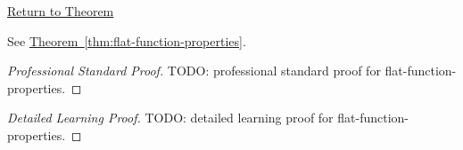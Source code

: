 \newpage
{}
\label{prf:flat-function-properties}

\begin{remark*}[Return]
\hyperref[thm:flat-function-properties]{Return to Theorem}
\end{remark*}

\begin{theorem*}
See \hyperref[thm:flat-function-properties]{Theorem~\ref*{thm:flat-function-properties}}.
\end{theorem*}

\begin{proof}[Professional Standard Proof]
\LRAProofBodyStart
TODO: professional standard proof for flat-function-properties.
\end{proof}

\begin{proof}[Detailed Learning Proof]
\LRAProofBodyStart
TODO: detailed learning proof for flat-function-properties.
\end{proof}

\begin{remark*}
\end{remark*}

\begin{dependencies}
\NoLocalDependencies
\end{dependencies}

\clearpage
